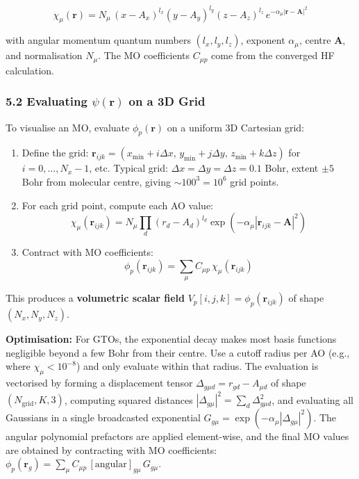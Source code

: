 \documentclass[
  11pt,
]{report}
\begin{document}
\[\chi_\mu(\mathbf{r}) = N_\mu\, (x - A_x)^{l_x}(y - A_y)^{l_y}(z - A_z)^{l_z}\, e^{-\alpha_\mu |\mathbf{r} - \mathbf{A}|^2}\]

with angular momentum quantum numbers \((l_x, l_y, l_z)\), exponent
\(\alpha_\mu\), centre \(\mathbf{A}\), and normalisation \(N_\mu\). The
MO coefficients \(C_{\mu p}\) come from the converged HF calculation.

\subsubsection{\texorpdfstring{5.2 Evaluating \(\psi(\mathbf{r})\) on a
3D
Grid}{5.2 Evaluating \textbackslash psi(\textbackslash mathbf\{r\}) on a 3D Grid}}\label{evaluating-psimathbfr-on-a-3d-grid}

To visualise an MO, evaluate \(\phi_p(\mathbf{r})\) on a uniform 3D
Cartesian grid:

\begin{enumerate}
\def\labelenumi{\arabic{enumi}.}
\item
  Define the grid:
  \(\mathbf{r}_{ijk} = (x_{\min} + i\Delta x, \, y_{\min} + j\Delta y, \, z_{\min} + k\Delta z)\)
  for \(i = 0, \ldots, N_x-1\), etc. Typical grid:
  \(\Delta x = \Delta y = \Delta z = 0.1\) Bohr, extent \(\pm 5\) Bohr
  from molecular centre, giving \(\sim 100^3 = 10^6\) grid points.
\item
  For each grid point, compute each AO value:
  \[\chi_\mu(\mathbf{r}_{ijk}) = N_\mu \prod_d (r_d - A_d)^{l_d} \exp(-\alpha_\mu|\mathbf{r}_{ijk} - \mathbf{A}|^2)\]
\item
  Contract with MO coefficients:
  \[\phi_p(\mathbf{r}_{ijk}) = \sum_\mu C_{\mu p}\, \chi_\mu(\mathbf{r}_{ijk})\]
\end{enumerate}

This produces a \textbf{volumetric scalar field}
\(V_p[i,j,k] = \phi_p(\mathbf{r}_{ijk})\) of shape \((N_x, N_y, N_z)\).

\textbf{Optimisation:} For GTOs, the exponential decay makes most basis
functions negligible beyond a few Bohr from their centre. Use a cutoff
radius per AO (e.g., where \(\chi_\mu < 10^{-8}\)) and only evaluate
within that radius. The evaluation is vectorised by forming a
displacement tensor \(\Delta_{g\mu d} = r_{gd} - A_{\mu d}\) of shape
\((N_{\text{grid}}, K, 3)\), computing squared distances
\(|\Delta_{g\mu}|^2 = \sum_d \Delta_{g\mu d}^2\), and evaluating all
Gaussians in a single broadcasted exponential
\(G_{g\mu} = \exp(-\alpha_\mu |\Delta_{g\mu}|^2)\). The angular
polynomial prefactors are applied element-wise, and the final MO values
are obtained by contracting with MO coefficients:
\(\phi_p(\mathbf{r}_g) = \sum_\mu C_{\mu p}\, [\text{angular}]_{g\mu}\, G_{g\mu}\).
\end{document}

